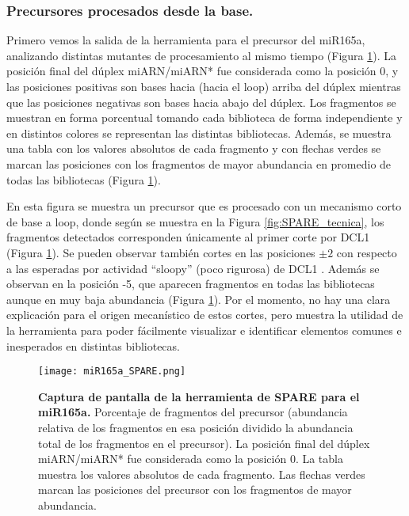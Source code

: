 \subsubsection{Precursores procesados desde la base.}
Primero vemos la salida de la herramienta para el precursor del  miR165a, analizando distintas mutantes de procesamiento al mismo tiempo (Figura \ref{fig:miR165a_SPARE}).
La posición final del dúplex miARN/miARN* fue considerada como la posición 0, y las posiciones positivas son bases hacia (hacia el loop) arriba del dúplex mientras que las posiciones negativas son bases hacia abajo del dúplex.
Los fragmentos se muestran en forma porcentual tomando cada biblioteca de forma independiente y en distintos colores se representan las distintas bibliotecas.
Además, se muestra una tabla con los valores absolutos de cada fragmento y con flechas verdes se marcan las posiciones con los fragmentos de mayor abundancia en promedio de todas las bibliotecas (Figura \ref{fig:miR165a_SPARE}).
 
En esta figura se muestra un precursor que es procesado con un mecanismo corto de base a loop, donde según se muestra en la Figura \ref{fig:SPARE_tecnica}, los fragmentos detectados corresponden únicamente al primer corte por DCL1 (Figura \ref{fig:miR165a_SPARE}).
Se pueden observar también cortes en las posiciones $\pm 2$ con respecto a las esperadas por actividad ``sloopy'' (poco rigurosa) de DCL1 \citep{pmid17989254}.
Además se observan en la posición -5, que aparecen fragmentos en todas las bibliotecas aunque en muy baja abundancia (Figura \ref{fig:miR165a_SPARE}).
Por el momento, no hay una clara explicación para el origen mecanístico de estos cortes, pero muestra la utilidad de la herramienta para poder fácilmente visualizar e identificar elementos comunes e inesperados en distintas bibliotecas.


\begin{landscape}
    \begin{figure}[htbp!] 
        \centering    
        \texttt{[image: miR165a\_SPARE.png]}
        \caption[Captura de pantalla de la herramienta de SPARE para el miR165a]{
        \textbf{Captura de pantalla de la herramienta de SPARE para el miR165a.}
        Porcentaje de fragmentos del precursor (abundancia relativa de los fragmentos en esa posición dividido la abundancia total de los fragmentos en el precursor).
        La posición final del dúplex miARN/miARN* fue considerada como la posición 0.
        La tabla muestra los valores absolutos de cada fragmento.
        Las flechas verdes marcan las posiciones del precursor con los fragmentos de mayor abundancia. 
        }
         \label{fig:miR165a_SPARE}
    \end{figure}
\end{landscape}


